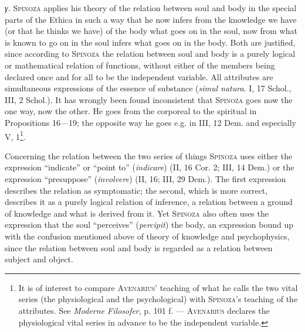 \documentclass[12pt]{article}
\newcommand{\opage}[1]{\marginnote{\footnotesize\textit{[#1]}}}
\begin{document}
\textit{γ.} \textsc{Spinoza} applies his theory of the relation between soul and body in
the special parts of the Ethica in such a way that he now infers from the knowledge we have
(or that he thinks we have) of the body what goes on in the soul, now from what is known to
go on in the soul infers what goes on in the body. Both are justified, since according to
\textsc{Spinoza} the relation between soul and body is a purely logical or mathematical
relation of functions, without either of the members being declared once \opage{44}and for
all to be the independent variable. All attributes are simultaneous expressions of the
essence of substance (\textit{simul natura}. I, 17 Schol., III, 2 Schol.). It has wrongly
been found inconsistent that \textsc{Spinoza} goes now the one way, now the other. He goes
from the corporeal to the spiritual in Propositions 16---19; the opposite way he goes e.g.
in III, 12 Dem. and especially V, 1\footnote{It is of interest to compare
\textsc{Avenarius}' teaching of what he calls the two vital series (the physiological and
the psychological) with \textsc{Spinoza}'s teaching of the attributes. See \textit{Moderne
Filosofer}, p. 101 f. --- \textsc{Avenarius} declares the physiological vital series in
advance to be the independent variable.}.

Concerning the relation between the two series of things \textsc{Spinoza} uses either the
expression ``indicate'' or ``point to'' (\textit{indicare}) (II, 16 Cor. 2; III, 14 Dem.) or
the expression ``presuppose'' (\textit{involvere}) (II, 16; III, 29 Dem.). The first
expression describes the relation as symptomatic; the second, which is more correct,
describes it as a purely logical relation of inference, a relation between a ground of
knowledge and what is derived from it. Yet \textsc{Spinoza} also often uses the expression
that the soul ``perceives'' (\textit{percipit}) the body, an expression bound up with the
confusion mentioned above of theory of knowledge and psychophysics, since the relation
between soul and body is regarded as a relation between subject and object.
\end{document}
